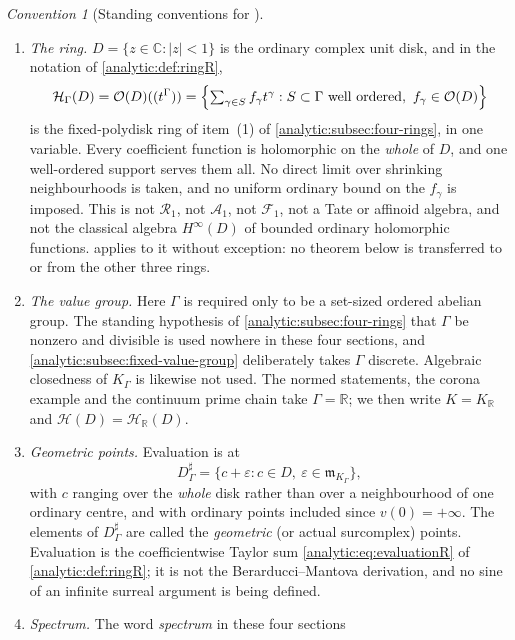 \documentclass[11pt,letterpaper]{article}
\theoremstyle{definition}
\theoremstyle{remark}
\newtheorem{convention}[theorem]{Convention}
\newcommand{\C}{\mathbb C}
\newcommand{\R}{\mathbb R}
\newcommand{\A}{\mathscr A}
\newcommand{\RR}{\mathscr R}
\newcommand{\FF}{\mathscr F}
\newcommand{\HH}{\mathcal H}
\newcommand{\m}{\mathfrak m}
\newcommand{\OO}{\mathcal O}
\numberwithin{equation}{section}
\begin{document}
\begin{convention}[Standing conventions for
]
\label{analytic:conv:fixed}
\begin{enumerate}
\item \emph{The ring.} $D=\{z\in\C:|z|<1\}$ is the ordinary complex unit
disk, and in the notation of \cref{analytic:def:ringR},
\[
 \HH_\Gamma(D)=\OO(D)((t^\Gamma))
 =\Bigl\{\textstyle\sum_{\gamma\in S}f_\gamma t^\gamma:
 S\subset\Gamma\ \text{well ordered},\ f_\gamma\in\OO(D)\Bigr\}
\]
is the fixed-polydisk ring of item~(1) of
\cref{analytic:subsec:four-rings}, in one variable. Every coefficient
function is holomorphic on the \emph{whole} of $D$, and one well-ordered
support serves them all. No direct limit over shrinking neighbourhoods is
taken, and no uniform ordinary bound on the $f_\gamma$ is imposed. This is
not $\RR_1$, not $\A_1$, not $\FF_1$, not a Tate or affinoid algebra, and
not the classical algebra $H^\infty(D)$ of bounded ordinary holomorphic
functions.  applies to it without exception: no
theorem below is transferred to or from the other three rings.
\item \emph{The value group.} Here $\Gamma$ is required only to be a
set-sized ordered abelian group. The standing hypothesis of
\cref{analytic:subsec:four-rings} that $\Gamma$ be nonzero and divisible is
used nowhere in these four sections, and
\cref{analytic:subsec:fixed-value-group} deliberately takes $\Gamma$
discrete. Algebraic closedness of $K_\Gamma$ is likewise not used. The
normed statements, the corona example and the continuum prime chain take
$\Gamma=\R$; we then write $K=K_\R$ and $\HH(D)=\HH_\R(D)$.
\item \emph{Geometric points.} Evaluation is at
\begin{equation}\label{analytic:eq:fixed-Dsharp}
 D^\sharp_\Gamma=\{c+\varepsilon:c\in D,\ \varepsilon\in\m_{K_\Gamma}\},
\end{equation}
with $c$ ranging over the \emph{whole} disk rather than over a
neighbourhood of one ordinary centre, and with ordinary points included
since $v(0)=+\infty$. The elements of $D^\sharp_\Gamma$ are called the
\emph{geometric} (or actual surcomplex) points. Evaluation is the
coefficientwise Taylor sum \eqref{analytic:eq:evaluationR} of
\cref{analytic:def:ringR}; it is not the Berarducci--Mantova derivation,
and no sine of an infinite surreal argument is being defined.
\item \emph{Spectrum.} The word \emph{spectrum} in these four sections

\end{enumerate}
\end{convention}
\end{document}
